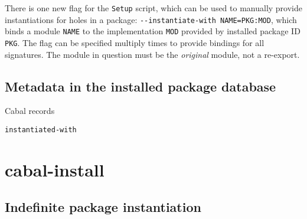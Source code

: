 \documentclass{article}
\begin{document}
There is one new flag for the \texttt{Setup} script, which can be
used to manually provide instantiations for holes in a package:
\verb|--instantiate-with NAME=PKG:MOD|, which binds a module \verb|NAME|
to the implementation \verb|MOD| provided by installed package ID \verb|PKG|.
The flag can be specified multiply times to provide bindings for all
signatures.  The module in question must be the \emph{original} module,
not a re-export.



\subsection{Metadata in the installed package database}

Cabal records

\texttt{instantiated-with}

\section{cabal-install}

\subsection{Indefinite package instantiation}
\end{document}
